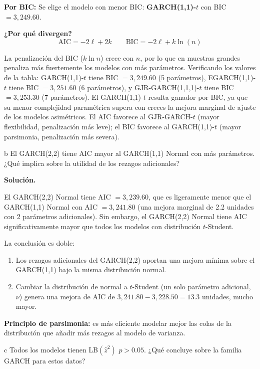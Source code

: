 \documentclass[11pt,a4paper]{article}
\begin{document}
\textbf{Por BIC:} Se elige el modelo con menor BIC: \textbf{GARCH(1,1)-$t$} con BIC $=3{,}249.60$.

\textbf{¿Por qué divergen?}
\[
\text{AIC} = -2\ell + 2k \qquad \text{BIC} = -2\ell + k\ln(n)
\]

La penalización del BIC ($k\ln n$) crece con $n$, por lo que en muestras grandes penaliza más fuertemente los modelos con más parámetros. Verificando los valores de la tabla: GARCH(1,1)-$t$ tiene BIC $=3{,}249.60$ (5 parámetros), EGARCH(1,1)-$t$ tiene BIC $=3{,}251.60$ (6 parámetros), y GJR-GARCH(1,1,1)-$t$ tiene BIC $=3{,}253.30$ (7 parámetros). El GARCH(1,1)-$t$ resulta ganador por BIC, ya que su menor complejidad paramétrica supera con creces la mejora marginal de ajuste de los modelos asimétricos. El AIC favorece al GJR-GARCH-$t$ (mayor flexibilidad, penalización más leve); el BIC favorece al GARCH(1,1)-$t$ (mayor parsimonia, penalización más severa).

\begin{cajaInciso}{b}
El GARCH(2,2) tiene AIC mayor al GARCH(1,1) Normal con más parámetros. ¿Qué implica sobre la utilidad de los rezagos adicionales?
\end{cajaInciso}

\textbf{Solución.}

El GARCH(2,2) Normal tiene AIC $=3{,}239.60$, que es ligeramente menor que el GARCH(1,1) Normal con AIC $=3{,}241.80$ (una mejora marginal de 2.2 unidades con 2 parámetros adicionales). Sin embargo, el GARCH(2,2) Normal tiene AIC significativamente mayor que todos los modelos con distribución $t$-Student.

La conclusión es doble:
\begin{enumerate}[leftmargin=*]
  \item Los rezagos adicionales del GARCH(2,2) aportan una mejora mínima sobre el GARCH(1,1) bajo la misma distribución normal.
  \item Cambiar la distribución de normal a $t$-Student (un solo parámetro adicional, $\nu$) genera una mejora de AIC de $3{,}241.80 - 3{,}228.50 = 13.3$ unidades, mucho mayor.
\end{enumerate}

\textbf{Principio de parsimonia:} es más eficiente modelar mejor las colas de la distribución que añadir más rezagos al modelo de varianza.

\begin{cajaInciso}{c}
Todos los modelos tienen LB$(\hat{z}^2)$ $p>0.05$. ¿Qué concluye sobre la familia GARCH para estos datos?
\end{cajaInciso}
\end{document}

